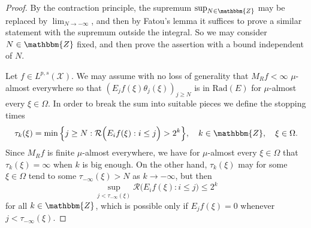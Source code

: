 \documentclass[a4paper,10pt]{amsart}
\theoremstyle{plain}
\theoremstyle{definition}
\theoremstyle{remark}
\begin{document}
\begin{proof}
By the contraction principle, the supremum $\sup_{N\in{\mathbbm{Z}}}$ may be replaced by $\lim_{N\to-\infty}$, and then by Fatou's lemma it suffices to prove a similar statement with the supremum outside the integral. So we may consider $N\in{\mathbbm{Z}}$ fixed, and then prove the assertion with a bound independent of $N$.
  
Let $f\in L^{p,s}(\mathcal{X})$.
    We may assume with no loss of generality that $M_Rf < \infty$ $\mu$-almost everywhere
    so that $(E_jf(\xi)\theta_j(\xi))_{j\geq N}$ is in $\text{Rad}(E)$ for $\mu$-almost every $\xi\in\Omega$.
    In order to break the sum into suitable pieces we define the stopping times
    \begin{equation*}
      \tau_k(\xi ) = \min \Big\{ j\geq N : \mathcal{R} \Big(  E_if(\xi ) : i\leq j \Big) > 2^k \Big\} , \quad
      k\in{\mathbbm{Z}} , \quad \xi\in\Omega .
    \end{equation*}
    Since $M_Rf$ is finite $\mu$-almost everywhere, we have for $\mu$-almost every $\xi\in\Omega$ that
    $\tau_k(\xi ) = \infty$ when $k$ is big enough. On the other hand, 
    $\tau_k(\xi )$ may for some $\xi\in\Omega$ tend to some
    $\tau_{-\infty} (\xi ) > N$ as $k\to -\infty$, but then
    \begin{equation*}
      \sup_{j < \tau_{-\infty}(\xi )} \mathcal{R} \Big( E_if(\xi ) : i\leq j \Big) \leq 2^k
    \end{equation*}
    for all $k\in{\mathbbm{Z}}$, which is possible only if $E_jf(\xi ) = 0$ whenever $j < \tau_{-\infty}(\xi )$.
  

\end{proof}
\end{document}
